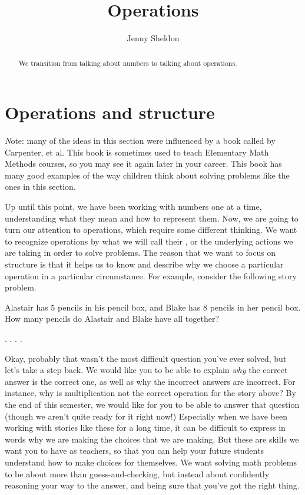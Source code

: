 \documentclass{ximera}
\title{Operations}
\author{Jenny Sheldon}
\begin{document}
\begin{abstract}
We transition from talking about numbers to talking about operations.
\end{abstract}
\maketitle



\section{Operations and structure}

{\emph Note: many of the ideas in this section were influenced by a book called  by Carpenter, et al. This book is sometimes used to teach Elementary Math Methods courses, so you may see it again later in your career. This book has many good examples of the way children think about solving problems like the ones in this section.}

Up until this point, we have been working with numbers one at a time, understanding what they mean and how to represent them. Now, we are going to turn our attention to operations, which require some different thinking. We want to recognize operations by what we will call their , or the underlying actions we are taking in order to solve problems. The reason that we want to focus on structure is that it helps us to know and describe why we choose a particular operation in a particular circumstance. For example, consider the following story problem.

\begin{question}
Alastair has $5$ pencils in his pencil box, and Blake has $8$ pencils in her pencil box. How many pencils do Alastair and Blake have all together?

\begin{multipleChoice}
.
.
.
.
\end{multipleChoice}
\end{question}

Okay, probably that wasn't the most difficult question you've ever solved, but let's take a step back. We would like you to be able to explain \emph{why} the correct answer is the correct one, as well as why the incorrect answers are incorrect. For instance, why is multiplication not the correct operation for the story above? By the end of this semester, we would like for you to be able to answer that question (though we aren't quite ready for it right now!) Especially when we have been working with stories like these for a long time, it can be difficult to express in words why we are making the choices that we are making. But these are skills we want you to have as teachers, so that you can help your future students understand how to make choices for themselves. We want solving math problems to be about more than guess-and-checking, but instead about confidently reasoning your way to the answer, and being sure that you've got the right thing.
\end{document}
